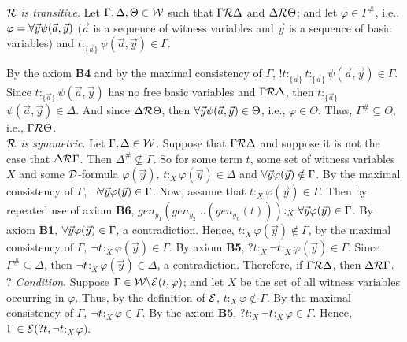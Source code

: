 \qquad \textit{$\mathcal{R}$ is transitive}. Let $\Gamma, \Delta, \Theta \in \mathcal{W}$ such that $\Gamma\mathcal{R}\Delta$ and $\Delta\mathcal{R}\Theta$; and let $\varphi \in \Gamma^{\#}$, i.e., $\varphi = \forall \vec{y} \psi(\vec{a},\vec{y})$ ($\vec{a}$ is a sequence of witness variables and $\vec{y}$ is a sequence of basic variables) and $t$$:_{\{\vec{a}\}}$$\psi(\vec{a},\vec{y}) \in \Gamma$.

\qquad By the axiom \textbf{B4} and by the maximal consistency of $\Gamma$,  $!t$$:_{\{\vec{a}\}}$$ t$$:_{\{\vec{a}\}}$$\psi(\vec{a},\vec{y}) \in \Gamma$. Since $t$$:_{\{\vec{a}\}}$$\psi(\vec{a},\vec{y})$ has no free basic variables and $\Gamma \mathcal{R} \Delta$, then $t$$:_{\{\vec{a}\}}$$\psi(\vec{a},\vec{y}) \in \Delta$. And since $\Delta\mathcal{R}\Theta$, then $\forall \vec{y} \psi(\vec{a},\vec{y}) \in \Theta$, i.e., $\varphi  \in \Theta$. Thus, $\Gamma^{\#} \subseteq \Theta$, i.e., $\Gamma\mathcal{R}\Theta$.\\





\qquad \textit{$\mathcal{R}$ is symmetric}. Let $\Gamma, \Delta \in \mathcal{W}$. Suppose that $\Gamma \mathcal{R} \Delta$ and suppose it is not the case that $\Delta \mathcal{R} \Gamma$. Then $\Delta^{\#} \nsubseteq \Gamma$. So for some term $t$, some set of witness variables $X$ and some $\mathcal{D}$-formula $\varphi(\vec{y})$,  $t$$:_{X}$$\varphi(\vec{y}) \in \Delta$ and $\forall \vec{y} \varphi(\vec{y}) \notin \Gamma$. By the maximal consistency of $\Gamma$,  $\neg \forall \vec{y} \varphi(\vec{y}) \in \Gamma$. Now, assume that $t$$:_{X}$$\varphi(\vec{y}) \in \Gamma$. Then by repeated use of axiom \textbf{B6}, $gen_{y_{1}}(gen_{y_{2}} \dots (gen_{y_{n}}(t)))$$:_{X}\forall \vec{y} \varphi(\vec{y})\in \Gamma$. By axiom \textbf{B1}, $\forall \vec{y} \varphi(\vec{y})\in \Gamma$, a contradiction. Hence, $t$$:_{X}$$\varphi(\vec{y}) \notin \Gamma$, by the maximal consistency of $\Gamma$, $\neg t$$:_{X}$$\varphi(\vec{y}) \in \Gamma$. By axiom \textbf{B5}, $?t$$:_{X}$$\neg t$$:_{X}$$\varphi(\vec{y}) \in \Gamma$. Since $\Gamma^{\#} \subseteq \Delta$, then $\neg t$$:_{X}$$\varphi(\vec{y}) \in \Delta$, a contradiction. Therefore, if $\Gamma \mathcal{R} \Delta$, then $\Delta \mathcal{R} \Gamma$.\\

\qquad \textit{$?$ Condition}. Suppose $\Gamma \in \mathcal{W} \backslash \mathcal{E}(t,\varphi)$; and let $X$ be the set of all witness variables occurring in $\varphi$. Thus, by the definition of $\mathcal{E}$, $t$$:_{X}$$\varphi \notin \Gamma$. By the maximal consistency of $\Gamma$,  $\neg t$$:_{X}$$\varphi \in \Gamma$. By the axiom \textbf{B5}, $?t$$:_{X}$$\neg t$$:_{X}$$\varphi \in \Gamma$. Hence, $\Gamma \in \mathcal{E}(?t,\neg t$$:_{X}$$\varphi)$.\\


